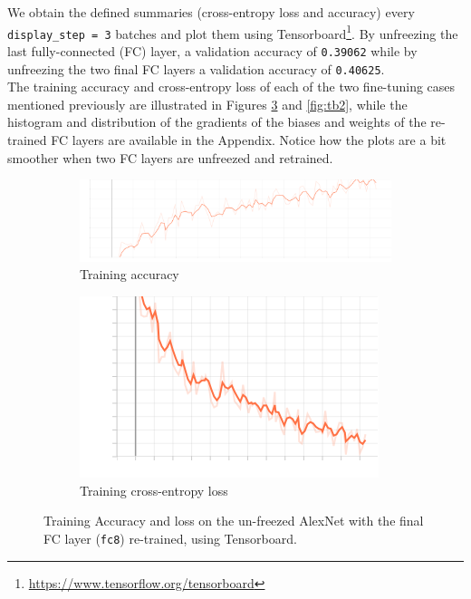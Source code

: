 \documentclass{article}
\def\code#1{\texttt{#1}}
\begin{document}
	We obtain the defined summaries (cross-entropy loss and accuracy) every \code{display\_step = 3} batches and plot them using Tensorboard\footnote{\url{https://www.tensorflow.org/tensorboard}}. By unfreezing the last fully-connected (FC) layer, a validation accuracy of \code{0.39062} while by unfreezing the two final FC layers a validation accuracy of \code{0.40625}. \\
	
	The training accuracy and cross-entropy loss of each of the two fine-tuning cases mentioned previously are illustrated in Figures \ref{fig:tb1} and \ref{fig:tb2}, while the histogram and distribution of the gradients of the biases and weights of the re-trained FC layers are available in the Appendix. Notice how the plots are a bit smoother when two FC layers are unfreezed and retrained.
	
	\begin{figure}[hbt!]
		\centering
		\hfil
		\begin{subfigure}{.40\textwidth}
			\includegraphics[width=\linewidth]{images/accuracy_fc8.png}
			\caption{Training accuracy}
			\label{MLEDdet}
		\end{subfigure}
		\hfil
		\begin{subfigure}{.40\textwidth}
			\includegraphics[width=\linewidth]{images/loss_fc8.png}
			\caption{Training cross-entropy loss}
			\label{energydetPSK}
		\end{subfigure}	
	\label{fig:tb1}
	\caption{Training Accuracy and loss on the un-freezed AlexNet with the final FC layer (\code{fc8}) re-trained, using Tensorboard.}
	\end{figure}
\end{document}

